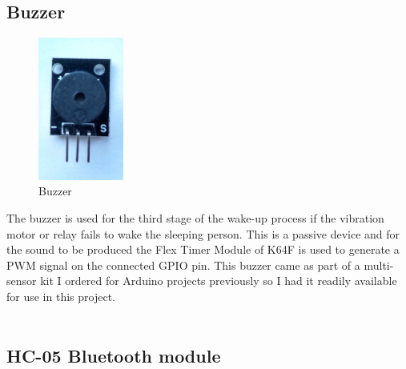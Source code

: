 \documentclass[12pt,a4paper]{article}
\begin{document}
		\subsection{Buzzer}
        \begin{figure}
         \centering
         \includegraphics[width=0.25\textwidth]{buzzer1.jpg}
         \caption{Buzzer}
        \end{figure}
		The buzzer is used for the third stage of the wake-up process if the vibration motor or 
		relay fails to wake the sleeping person. This is a passive device and for the sound to be produced the Flex Timer Module of K64F is used to generate a PWM signal on the connected GPIO pin. This buzzer came as part of a multi-sensor kit I ordered for Arduino projects previously so I had it readily available for use in this project.\\\\
		
		\subsection{HC-05 Bluetooth module}
		
\end{document}
